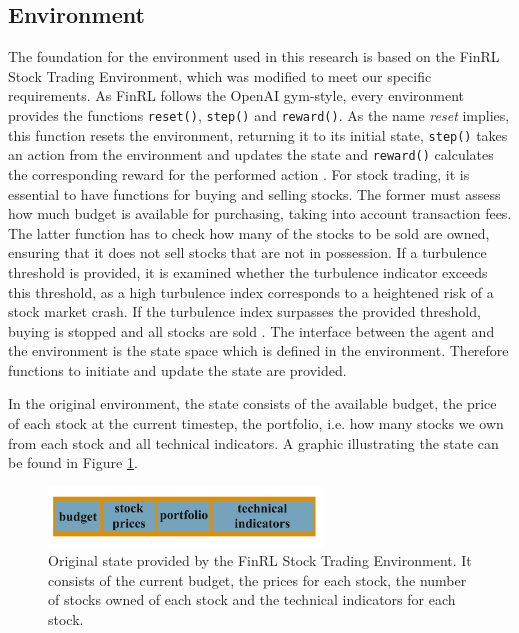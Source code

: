 \documentclass[12pt]{article}
\begin{document}


\subsection{Environment} %
\label{subsubsec:env}

The foundation for the environment used in this research is based on the FinRL Stock Trading Environment, which was modified to meet our specific requirements.
As FinRL follows the OpenAI gym-style, every environment provides the functions \texttt{reset()}, \texttt{step()} and \texttt{reward()}. As the name \textit{reset} implies, this function resets the environment, returning it to its initial state, \texttt{step()} takes an action from the environment and updates the state and \texttt{reward()} calculates the corresponding reward for the performed action \cite{liu2022finrlMeta}. For stock trading, it is essential to have functions for buying and selling stocks. The former must assess how much budget is available for purchasing, taking into account transaction fees. The latter function has to check how many of the stocks to be sold are owned, ensuring that it does not sell stocks that are not in possession. If a turbulence threshold is provided, it is examined whether the turbulence indicator exceeds this threshold, as a high turbulence index corresponds to a heightened risk of a stock market crash. If the turbulence index surpasses the provided threshold, buying is stopped and all stocks are sold \cite{liu2020finrl}.
The interface between the agent and the environment is the state space which is defined in the environment. Therefore functions to initiate and update the state are provided.  

In the original environment, the state consists of the available budget, the price of each stock at the current timestep, the portfolio, i.e. how many stocks we own from each stock and all technical indicators. A graphic illustrating the state can be found in Figure \ref{fig:oldState}.

\begin{figure}[h]
    \centering
    \includegraphics[width = 0.65\textwidth]{figs/old_state.pdf}
    \caption{Original state provided by the FinRL Stock Trading Environment. It consists of the current budget, the prices for each stock, the number of stocks owned of each stock and the technical indicators for each stock. }
    \label{fig:oldState}
\end{figure}
\end{document}
